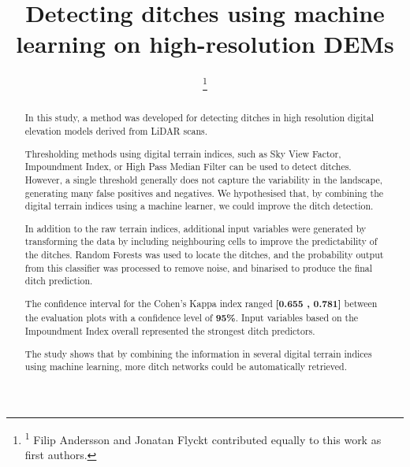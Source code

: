 \documentclass[]{interact}
\theoremstyle{plain}%
\theoremstyle{definition}
\theoremstyle{remark}
\begin{document}

\title{Detecting ditches using machine learning on high-resolution DEMs}

\author{
 
\footnote{\textsuperscript{1} Filip Andersson and Jonatan Flyckt contributed equally to this work as first authors.}}

\maketitle

\begin{abstract}
In this study, a method was developed for detecting ditches in high resolution digital elevation models derived from LiDAR scans.

Thresholding methods using digital terrain indices, such as Sky View Factor, Impoundment Index, or High Pass Median Filter can be used to detect ditches. However, a single threshold generally does not capture the variability in the landscape, generating many false positives and negatives. We hypothesised that, by combining the digital terrain indices using a machine learner, we could improve the ditch detection.

In addition to the raw terrain indices, additional input variables were generated by transforming the data by including neighbouring cells to improve the predictability of the ditches. Random Forests was used to locate the ditches, and the probability output from this classifier was processed to remove noise, and binarised to produce the final ditch prediction.

The confidence interval for the Cohen's Kappa index ranged \textbf{[0.655 , 0.781]} between the evaluation plots with a confidence level of \textbf{95\%}. Input variables based on the Impoundment Index overall represented the strongest ditch predictors.

The study shows that by combining the information in several digital terrain indices using machine learning, more ditch networks could be automatically retrieved.
\end{abstract}
\end{document}
